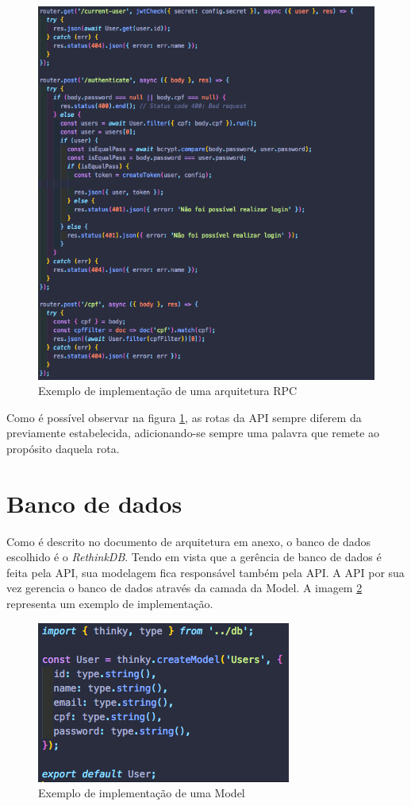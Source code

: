 \begin{figure}[!ht]
	\centering
		\includegraphics[scale=0.6]{figuras/software/rpc.png}
	\caption{Exemplo de implementação de uma arquitetura RPC}
	\label{fig:rpc}
\end{figure}

Como é possível observar na figura \ref{fig:rpc}, as rotas da API sempre diferem da previamente estabelecida, adicionando-se sempre uma palavra que remete ao propósito daquela rota.

\section{Banco de dados}

Como é descrito no documento de arquitetura em anexo, o banco de dados escolhido é o \textit{RethinkDB}. Tendo em vista que a gerência de banco de dados é feita pela API, sua modelagem fica responsável também pela API. A API por sua vez gerencia o banco de dados através da camada da Model. A imagem \ref{fig:model} representa um exemplo de implementação.

\begin{figure}[!ht]
	\centering
		\includegraphics[scale=1]{figuras/software/model.png}
	\caption{Exemplo de implementação de uma Model}
	\label{fig:model}
\end{figure}

